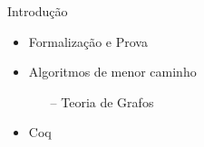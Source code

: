\begin{frame}{Introdução}
    \begin{itemize}
        \item Formalização e Prova
        \item Algoritmos de menor caminho
        \begin{itemize}
            \item [--] Teoria de Grafos
        \end{itemize}
        \item Coq
    \end{itemize}
\end{frame}